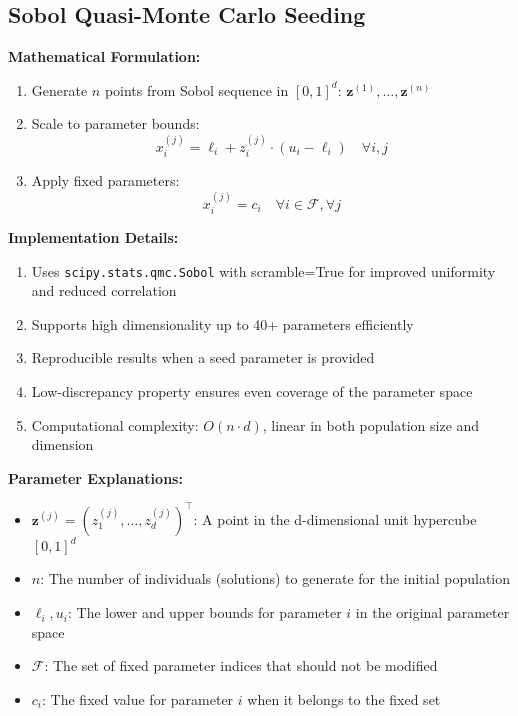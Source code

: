 \documentclass[12pt,a4paper]{article}
\begin{document}
\subsection{Sobol Quasi-Monte Carlo Seeding}
\textbf{Mathematical Formulation:}
\begin{enumerate}
\item Generate $n$ points from Sobol sequence in $[0,1]^d$: $\bm{z}^{(1)}, \dots, \bm{z}^{(n)}$
\item Scale to parameter bounds:
\begin{equation}
x_i^{(j)} = \ell_i + z_i^{(j)} \cdot (u_i - \ell_i) \quad \forall i,j \label{eq:sobol_scaling}
\end{equation}
\item Apply fixed parameters:
\begin{equation}
x_i^{(j)} = c_i \quad \forall i \in \mathcal{F}, \forall j \label{eq:sobol_fixed}
\end{equation}
\end{enumerate}

\textbf{Implementation Details:}
\begin{enumerate}
\item Uses \texttt{scipy.stats.qmc.Sobol} with scramble=True for improved uniformity and reduced correlation
\item Supports high dimensionality up to 40+ parameters efficiently
\item Reproducible results when a seed parameter is provided
\item Low-discrepancy property ensures even coverage of the parameter space
\item Computational complexity: $O(n \cdot d)$, linear in both population size and dimension
\end{enumerate}

\textbf{Parameter Explanations:}
\begin{itemize}
\item $\bm{z}^{(j)} = (z_1^{(j)}, \dots, z_d^{(j)})^\top$: A point in the d-dimensional unit hypercube $[0,1]^d$
\item $n$: The number of individuals (solutions) to generate for the initial population
\item $\ell_i, u_i$: The lower and upper bounds for parameter $i$ in the original parameter space
\item $\mathcal{F}$: The set of fixed parameter indices that should not be modified
\item $c_i$: The fixed value for parameter $i$ when it belongs to the fixed set
\end{itemize}
\end{document}
